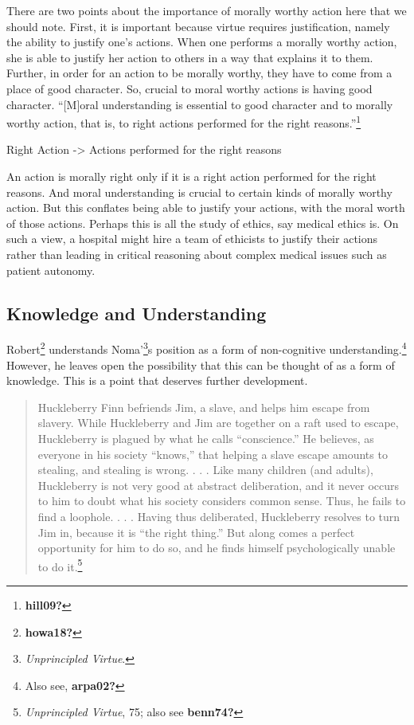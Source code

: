 \documentclass[
  12pt,
]{book}
\newenvironment{Shaded}{\begin{snugshade}}{\end{snugshade}}
\newcommand{\NormalTok}[1]{#1}
\theoremstyle{definition}
\theoremstyle{definition}
\theoremstyle{definition}
\theoremstyle{definition}
\theoremstyle{remark}
\begin{document}
There are two points about the importance of morally worthy action here that we should note. First, it is important because virtue requires justification, namely the ability to justify one's actions. When one performs a morally worthy action, she is able to justify her action to others in a way that explains it to them. Further, in order for an action to be morally worthy, they have to come from a place of good character. So, crucial to moral worthy actions is having good character. ``{[}M{]}oral understanding is essential to good character and to morally worthy action, that is, to right actions performed for the right reasons.''\footnote{\textbf{hill09?}}

\begin{Shaded}
\begin{Highlighting}[]

\NormalTok{Right Action {-}\textgreater{} Actions performed for the right reasons}
\end{Highlighting}
\end{Shaded}

An action is morally right only if it is a right action performed for the right reasons. And moral understanding is crucial to certain kinds of morally worthy action. But this conflates being able to justify your actions, with the moral worth of those actions. Perhaps this is all the study of ethics, say medical ethics is. On such a view, a hospital might hire a team of ethicists to justify their actions rather than leading in critical reasoning about complex medical issues such as patient autonomy.

\subsection*{Knowledge and Understanding}\label{knowledge-and-understanding}

Robert\footnote{\textbf{howa18?}} understands Noma'\footnote{\emph{Unprincipled {Virtue}}.}s position as a form of non-cognitive understanding.\footnote{Also see, \textbf{arpa02?}} However, he leaves open the possibility that this can be thought of as a form of knowledge. This is a point that deserves further development.

\begin{quote}
Huckleberry Finn befriends Jim, a slave, and helps him escape from slavery. While Huckleberry and Jim are together on a raft used to escape, Huckleberry is plagued by what he calls ``conscience.'' He believes, as everyone in his society ``knows,'' that helping a slave escape amounts to stealing, and stealing is wrong. . . . Like many children (and adults), Huckleberry is not very good at abstract deliberation, and it never occurs to him to doubt what his society considers common sense. Thus, he fails to find a loophole. . . . Having thus deliberated, Huckleberry resolves to turn Jim in, because it is ``the right thing.'' But along comes a perfect opportunity for him to do so, and he finds himself psychologically unable to do it.\footnote{\emph{Unprincipled {Virtue}}, 75; also see \textbf{benn74?}}
\end{quote}
\end{document}
